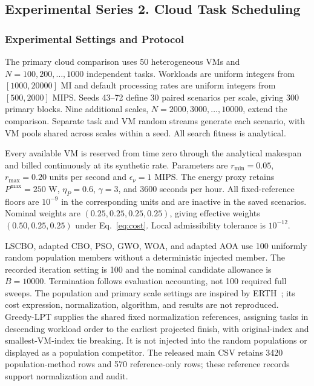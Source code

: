 \subsection{Experimental Series 2. Cloud Task Scheduling}\label{sec:cloudsim_exp}
\subsubsection{Experimental Settings and Protocol}\label{sec:cloud_protocol}
The primary cloud comparison uses 50 heterogeneous VMs and $N=100,200,\ldots,1000$ independent tasks. Workloads are uniform integers from $[1000,20000]$ MI and default processing rates are uniform integers from $[500,2000]$ MIPS. Seeds 43--72 define 30 paired scenarios per scale, giving 300 primary blocks. Nine additional scales, $N=2000,3000,\ldots,10000$, extend the comparison. Separate task and VM random streams generate each scenario, with VM pools shared across scales within a seed. All search fitness is analytical.

Every available VM is reserved from time zero through the analytical makespan and billed continuously at its synthetic rate. Parameters are $r_{\mathrm{min}}=0.05$, $r_{\mathrm{max}}=0.20$ units per second and $\epsilon_\nu=1$ MIPS. The energy proxy retains $P^{\mathrm{max}}=250$ W, $\eta_P=0.6$, $\gamma=3$, and 3600 seconds per hour. All fixed-reference floors are $10^{-9}$ in the corresponding units and are inactive in the saved scenarios. Nominal weights are $(0.25,0.25,0.25,0.25)$, giving effective weights $(0.50,0.25,0.25)$ under Eq.~\eqref{eq:cost}. Local admissibility tolerance is $10^{-12}$.

LSCBO, adapted CBO, PSO, GWO, WOA, and adapted AOA use 100 uniformly random population members without a deterministic injected member. The recorded iteration setting is 100 and the nominal candidate allowance is $B=10000$. Termination follows evaluation accounting, not 100 required full sweeps. The population and primary scale settings are inspired by ERTH~\cite{Qin2024}; its cost expression, normalization, algorithm, and results are not reproduced. Greedy-LPT supplies the shared fixed normalization references, assigning tasks in descending workload order to the earliest projected finish, with original-index and smallest-VM-index tie breaking. It is not injected into the random populations or displayed as a population competitor. The released main CSV retains 3420 population-method rows and 570 reference-only rows; these reference records support normalization and audit.

